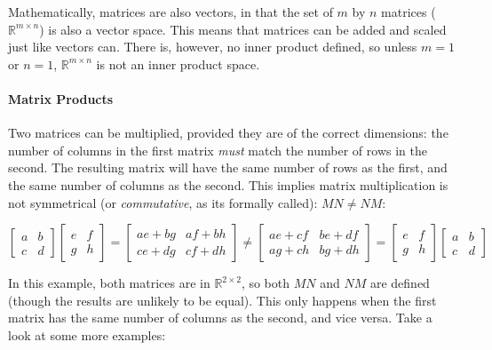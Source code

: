 Mathematically, matrices are also vectors, in that the set of $m$ by $n$ matrices ($\mathbb{R}^{m\times n}$) is also a vector space. This means that matrices can be added and scaled just like vectors can. There is, however, no inner product defined, so unless $m = 1$ or $n = 1$, $\mathbb{R}^{m\times n}$ is not an inner product space.


\paragraph{Matrix Products}
Two matrices can be multiplied, provided they are of the correct dimensions: the number of columns in the first matrix \emph{must} match the number of rows in the second. The resulting matrix will have the same number of rows as the first, and the same number of columns as the second. This implies matrix multiplication is not symmetrical (or \emph{commutative}, as its formally called): $MN \neq NM$:

    \begin{equation*}
      \begin{bmatrix} a & b \\ c & d\end{bmatrix}\begin{bmatrix}e & f \\ g & h\end{bmatrix} =
      \begin{bmatrix}ae+bg & af+bh \\ ce+dg & cf+dh \end{bmatrix}
      \neq
      \begin{bmatrix}ae+cf & be+df \\ ag+ch & bg+dh \end{bmatrix} =
      \begin{bmatrix}e & f \\ g & h\end{bmatrix}\begin{bmatrix} a & b \\ c & d\end{bmatrix}
    \end{equation*}

In this example, both matrices are in $\mathbb{R}^{2\times 2}$, so both $MN$ and $NM$ are defined (though the results are unlikely to be equal). This only happens when the first matrix has the same number of columns as the second, and vice versa. Take a look at some more examples:

